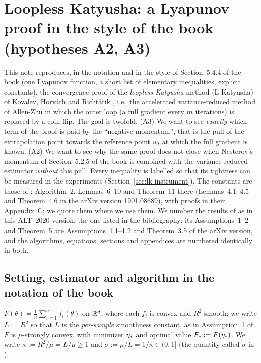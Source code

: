 \section{Loopless Katyusha: a Lyapunov proof in the style of the book (hypotheses A2, A3)}
\label{sec:lkatyusha}

This note reproduces, in the notation and in the style of Section~5.4.4 of the book \cite{bach2024learning} (one Lyapunov function, a short list of elementary inequalities, explicit constants), the convergence proof of the \emph{loopless Katyusha} method (L-Katyusha) of Kovalev, Horv\'ath and Richt\'arik \cite{kovalev2020dont}, i.e.\ the accelerated variance-reduced method of Allen-Zhu \cite{allenzhu2018katyusha} in which the outer loop (a full gradient every $m$ iterations) is replaced by a coin flip. The goal is twofold. (A3) We want to see \emph{exactly} which term of the proof is paid by the ``negative momentum'', that is the pull of the extrapolation point towards the reference point $w_t$ at which the full gradient is known. (A2) We want to see why the same proof does not close when Nesterov's momentum of Section~5.2.5 of the book is combined with the variance-reduced estimator \emph{without} this pull. Every inequality is labelled so that its tightness can be measured in the experiments (Section~\ref{sec:lk-instrument}). The constants are those of \cite{kovalev2020dont}: Algorithm~2, Lemmas~6--10 and Theorem~11 there (Lemmas~4.1--4.5 and Theorem~4.6 in the arXiv version 1901.08689), with proofs in their Appendix~C; we quote them where we use them. We number the results of \cite{kovalev2020dont} as in this ALT~2020 version, the one listed in the bibliography: its Assumptions~1--2 and Theorem~5 are Assumptions~1.1--1.2 and Theorem~3.5 of the arXiv version, and the algorithms, equations, sections and appendices are numbered identically in both.

\subsection{Setting, estimator and algorithm in the notation of the book}
\label{sec:lk-setting}

\begin{assumption}\label{ass:lk}
$F(\theta)=\frac1n\sum_{i=1}^n f_i(\theta)$ on $\mathbb{R}^d$, where each $f_i$ is convex and $R^2$-smooth; we write $L:=R^2$ so that $L$ is the \emph{per-sample} smoothness constant, as in Assumption~1 of \cite{kovalev2020dont}. $F$ is $\mu$-strongly convex, with minimizer $\eta_\ast$ and optimal value $F_\ast:=F(\eta_\ast)$. We write $\kappa:=R^2/\mu=L/\mu\ge 1$ and $\sigma:=\mu/L=1/\kappa\in(0,1]$ (the quantity called $\sigma$ in \cite{kovalev2020dont}).
\end{assumption}

